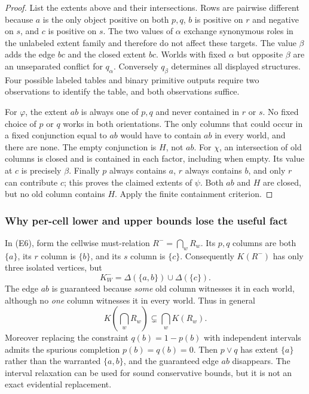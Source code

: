 \documentclass[11pt]{article}
\theoremstyle{definition}
\begin{document}
\begin{proof}
List the extents above and their intersections. Rows are pairwise different because $a$ is the only object positive on both $p,q$, $b$ is positive on $r$ and negative on $s$, and $c$ is positive on $s$. The two values of $\alpha$ exchange synonymous roles in the unlabeled extent family and therefore do not affect these targets. The value $\beta$ adds the edge $bc$ and the closed extent $bc$. Worlds with fixed $\alpha$ but opposite $\beta$ are an unseparated conflict for $q_\alpha$. Conversely $q_\beta$ determines all displayed structures. Four possible labeled tables and binary primitive outputs require two observations to identify the table, and both observations suffice.

For $\varphi$, the extent $ab$ is always one of $p,q$ and never contained in $r$ or $s$. No fixed choice of $p$ or $q$ works in both orientations. The only columns that could occur in a fixed conjunction equal to $ab$ would have to contain $ab$ in every world, and there are none. The empty conjunction is $H$, not $ab$. For $\chi$, an intersection of old columns is closed and is contained in each factor, including when empty. Its value at $c$ is precisely $\beta$. Finally $p$ always contains $a$, $r$ always contains $b$, and only $r$ can contribute $c$; this proves the claimed extents of $\psi$. Both $ab$ and $H$ are closed, but no old column contains $H$. Apply the finite containment criterion.
\end{proof}

\subsubsection{Why per-cell lower and upper bounds lose the useful fact}
In (E6), form the cellwise must-relation $R^- =\bigcap_w R_w$. Its $p,q$ columns are both $\{a\}$, its $r$ column is $\{b\}$, and its $s$ column is $\{c\}$. Consequently $K(R^-)$ has only three isolated vertices, but
\[
 K^-_W=\Delta(\{a,b\})\cup\Delta(\{c\}). \tag{E7}
\]
The edge $ab$ is guaranteed because \emph{some} old column witnesses it in each world, although no \emph{one} column witnesses it in every world. Thus in general
\[
 K\!\left(\bigcap_wR_w\right)\subsetneq\bigcap_wK(R_w).
\]
Moreover replacing the constraint $q(b)=1-p(b)$ with independent intervals admits the spurious completion $p(b)=q(b)=0$. Then $p\vee q$ has extent $\{a\}$ rather than the warranted $\{a,b\}$, and the guaranteed edge $ab$ disappears. The interval relaxation can be used for sound conservative bounds, but it is not an exact evidential replacement.
\end{document}
